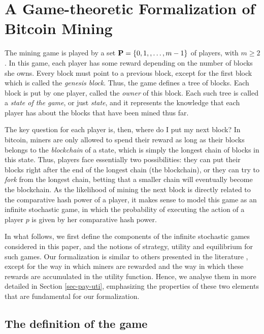 
\section{A Game-theoretic Formalization of Bitcoin Mining}
\label{sec-formalization}

The mining game is played by a set $\mathbf{P} = \{0, 1, , \ldots, m-1\}$ of players, with $m \geq 2$.
In this game, each player has some reward depending on the number of blocks she owns. Every block must point to a previous block, except for the first block which is called the {\em genesis block}. Thus, the game defines a tree of blocks. Each block is put by one player, called the {\em owner} of this block. Each such tree is called a {\em state of the game}, or just {\em state}, and it represents the knowledge that each player has about the blocks that have been mined thus far.

The key question for each player is, then, where do I put my next block? In bitcoin, miners are only allowed to spend their reward as long
as their blocks belongs to the \emph{blockchain} of a state, which is simply the longest chain of blocks in this state. Thus, players face essentially two possibilities: they can put their blocks right after the end of the longest chain (the blockchain), or they can try to \emph{fork}
from the longest chain, betting that a smaller chain will eventually become the blockchain. As the likelihood of
mining the next block is directly related to the comparative hash power of a player, it makes sense to model this game as an infinite
stochastic game, in which the probability of executing the action of a player $p$ is given by her comparative hash power.

In what follows, we first define the components of the infinite stochastic games considered in this paper, and the notions of strategy, utility  and equilibrium for such games. Our formalization is similar to others presented in the literature \cite{mininggames:2016}, except for the way in which miners are rewarded and the way in which these rewards are accumulated in the utility function. Hence, we analyse them in more detailed in Section \ref{sec-pay-uti}, emphasizing the properties of these two elements that are fundamental for our formalization.


\subsection{The definition of the game}
